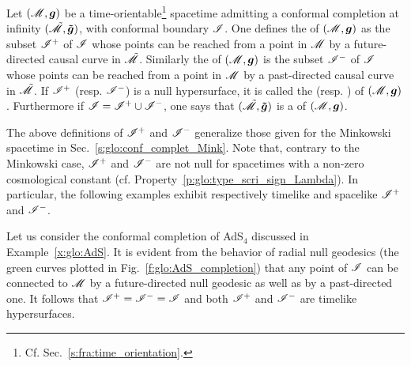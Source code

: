 \begin{greybox}
Let $(\mathscr{M},\bm{g})$ be a time-orientable\footnote{Cf. Sec.~\ref{s:fra:time_orientation}.} spacetime admitting a conformal completion at infinity $(\tilde{\mathscr{M}},\bm{\tilde{g}})$, with conformal boundary $\mathscr{I}$.
One defines the  of $(\mathscr{M},\bm{g})$ as the subset $\mathscr{I}^+$ of $\mathscr{I}$ whose points can be reached from a point in $\mathscr{M}$ by a future-directed causal curve in $\tilde{\mathscr{M}}$.
Similarly the   of $(\mathscr{M},\bm{g})$ is the subset $\mathscr{I}^-$ of
$\mathscr{I}$ whose points can be reached from a point in $\mathscr{M}$ by a past-directed causal curve in $\tilde{\mathscr{M}}$.
If $\mathscr{I}^+$ (resp. $\mathscr{I}^-$) is a null hypersurface, it is called the
(resp. )
of $(\mathscr{M},\bm{g})$.
Furthermore if $\mathscr{I} = \mathscr{I}^+ \cup \mathscr{I}^-$, one says that $(\tilde{\mathscr{M}},\bm{\tilde{g}})$ is a
of $(\mathscr{M},\bm{g})$.
\end{greybox}


\begin{remark}
The above definitions of $\mathscr{I}^+$ and $\mathscr{I}^-$
generalize those given for the Minkowski spacetime in Sec.~\ref{s:glo:conf_complet_Mink}.
Note that, contrary to the Minkowski case, $\mathscr{I}^+$ and $\mathscr{I}^-$ are not null
for spacetimes with a non-zero cosmological constant (cf. Property~\ref{p:glo:type_scri_sign_Lambda}).
In particular, the following
examples exhibit respectively timelike and spacelike $\mathscr{I}^+$ and $\mathscr{I}^-$.
\end{remark}

\begin{example}
Let us consider the conformal completion of AdS$_{4}$ discussed in Example~\ref{x:glo:AdS}.
It is evident from the behavior of radial null geodesics (the green curves plotted in Fig.~\ref{f:glo:AdS_completion}) that any point of $\mathscr{I}$ can be connected to $\mathscr{M}$ by a
future-directed null geodesic as well as by a past-directed one. It follows that
$\mathscr{I}^+ = \mathscr{I}^- = \mathscr{I}$ and both $\mathscr{I}^+$ and $\mathscr{I}^-$ are timelike hypersurfaces.
\end{example}

